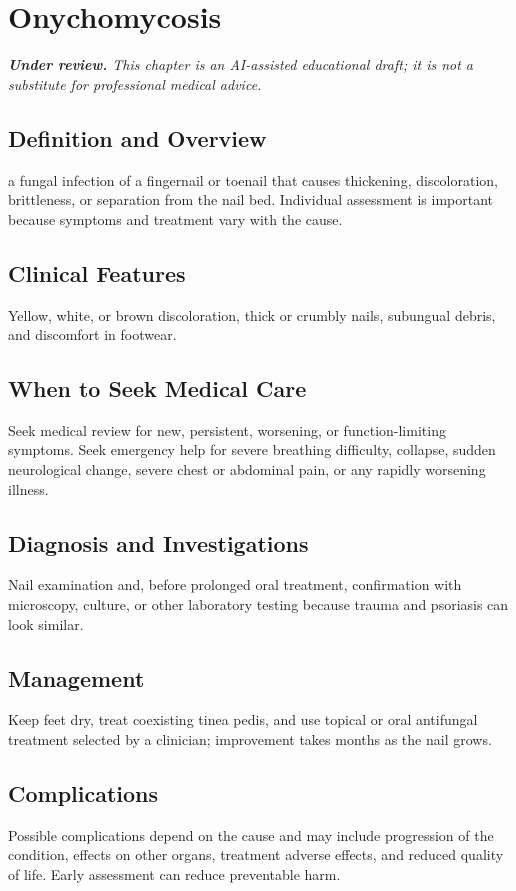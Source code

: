 \chapter{Onychomycosis}

\medskip
\noindent\textit{\textbf{Under review.} This chapter is an AI-assisted educational draft; it is not a substitute for professional medical advice.}

\section*{Definition and Overview}
a fungal infection of a fingernail or toenail that causes thickening, discoloration, brittleness, or separation from the nail bed. Individual assessment is important because symptoms and treatment vary with the cause.

\section*{Clinical Features}
Yellow, white, or brown discoloration, thick or crumbly nails, subungual debris, and discomfort in footwear.

\section*{When to Seek Medical Care}
Seek medical review for new, persistent, worsening, or function-limiting symptoms. Seek emergency help for severe breathing difficulty, collapse, sudden neurological change, severe chest or abdominal pain, or any rapidly worsening illness.

\section*{Diagnosis and Investigations}
Nail examination and, before prolonged oral treatment, confirmation with microscopy, culture, or other laboratory testing because trauma and psoriasis can look similar.

\section*{Management}
Keep feet dry, treat coexisting tinea pedis, and use topical or oral antifungal treatment selected by a clinician; improvement takes months as the nail grows.

\section*{Complications}
Possible complications depend on the cause and may include progression of the condition, effects on other organs, treatment adverse effects, and reduced quality of life. Early assessment can reduce preventable harm.

